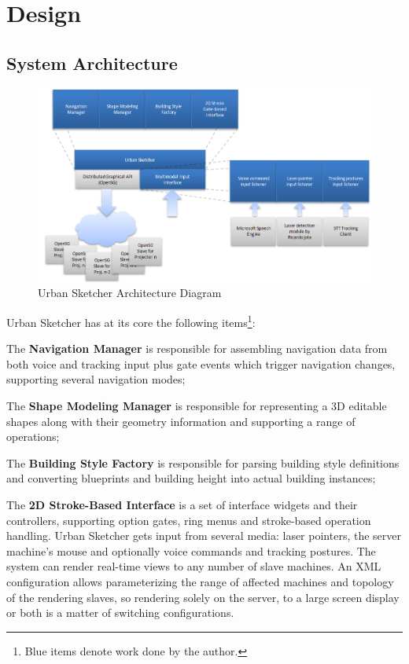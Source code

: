 \chapter{Design}



\section{System Architecture}


\begin{figure}[!ht]
		\centering
		\includegraphics[width=16cm]{gfx/charts/block-diagram.png}
		\caption{Urban Sketcher Architecture Diagram}
		\label{fig:block-diagram}
\end{figure}


Urban Sketcher has at its core the following items\footnote{Blue items denote work done by the author.}:

The \textbf{Navigation Manager} is
		responsible for assembling navigation data from
		both voice and tracking input plus gate events which trigger navigation changes,
		supporting several navigation modes;
	
The \textbf{Shape Modeling Manager} is
		responsible for representing a 3D editable shapes
		along with their geometry information and supporting a range of operations;
	
The \textbf{Building Style Factory} is
		responsible for parsing building style definitions
		and converting blueprints and building height into actual building instances;
	
The \textbf{2D Stroke-Based Interface} is 
		a set of interface widgets and their controllers,
		supporting option gates, ring menus and stroke-based operation handling.
Urban Sketcher gets input from several media:
laser pointers, the server machine's mouse and optionally voice commands and tracking postures.
The system can render real-time views to any number of slave machines.
An XML configuration allows parameterizing the range of affected machines and topology of the rendering slaves,
so rendering solely on the server, to a large screen display or both is a matter of switching configurations.


